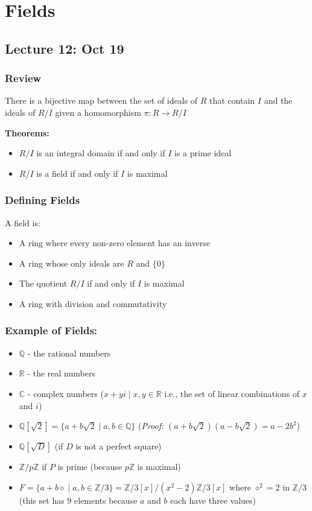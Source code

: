 \documentclass[12pt]{report}
\newcommand{\R}{\mathbb{R}}
\newcommand{\Z}{\mathbb{Z}}
\begin{document}
\chapter*{Fields}
\section*{Lecture 12: Oct 19}
\subsection*{Review}
There is a bijective map between the set of ideals of $R$ that contain $I$ and the ideals of $R/I$ given a homomorphism $\pi: R \to R/I$

\textbf{Theorems:}
\begin{itemize}
    \item $R/I$ is an integral domain if and only if $I$ is a prime ideal
    \item $R/I$ is a field if and only if $I$ is maximal 
\end{itemize}

\subsection*{Defining Fields} 
A field is:
\begin{itemize}
    \item A ring where every non-zero element has an inverse 
    \item A ring whose only ideals are $R$ and $\{0\}$
    \item The quotient $R/I$ if and only if $I$ is maximal
    \item A ring with division and commutativity
\end{itemize}

\subsection*{Example of Fields:}
\begin{itemize}
    \item $\mathbb{Q}$ - the rational numbers 
    \item $\R$ - the real numbers 
    \item $\mathbb{C}$ - complex numbers ($x + yi \; | \; x, y \in \R$ i.e., the set of linear combinations of $x$ and $i$)
    \item $\mathbb{Q}[\sqrt 2] = \{a + b\sqrt 2 \; | \; a,b\in \mathbb{Q}\}$ (\emph{Proof:} $(a + b\sqrt 2)(a - b\sqrt 2) = a - 2b^2$)
    \item $\mathbb{Q}[\sqrt D]$ (if $D$ is not a perfect square)
    \item $\Z/p\Z$ if $P$ is prime (because $p\Z$ is maximal)
    \item $F =\{a + b \diamond \; | \; a, b \in \Z/3\} = \Z/3[x]/(x^2 -2)\Z/3[x]$ where $\diamond^2 = 2$ in $\Z/3$ (this set has $9$ elements because $a$ and $b$ each have three values)
\end{itemize}
\end{document}
